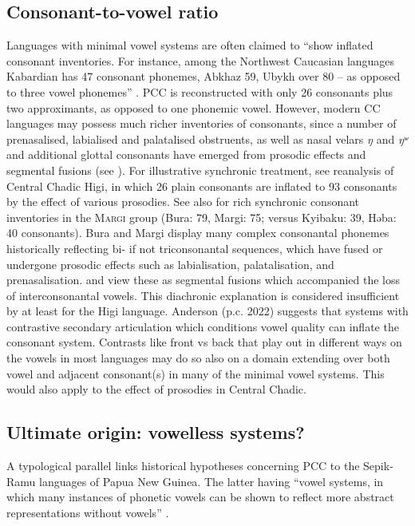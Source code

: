 \documentclass[output=paper]{langscibook}
\begin{document}
\subsection{Consonant-to-vowel ratio}
\label{sec:Wolff:3.1}
Languages with minimal vowel systems are often claimed to “show inflated consonant inventories. For instance, among the Northwest Caucasian languages Kabardian has 47 consonant phonemes, Abkhaz 59, Ubykh over 80 – as opposed to three vowel phonemes” \citep[66]{Anderson2016}. PCC is reconstructed with only 26 consonants plus two approximants, as opposed to one phonemic vowel. However, modern CC languages may possess much richer inventories of consonants, since a number of prenasalised, labialised and palatalised obstruents, as well as nasal velars \textit{ŋ} and \textit{ŋʷ} and additional glottal consonants have emerged from prosodic effects and segmental fusions (see \citealt{Wolffinpressb}). For illustrative synchronic treatment, see  reanalysis of Central Chadic Higi, in which 26 plain consonants are inflated to 93 consonants by the effect of various prosodies. See also \citet[465-468]{Hoffmann1987} for rich synchronic consonant inventories in the \textsc{Margi} group (Bura: 79, Margi: 75; versus Kyibaku: 39, Həba: 40 consonants). Bura and Margi display many complex consonantal phonemes historically reflecting bi- if not triconsonantal sequences, which have fused or undergone prosodic effects such as labialisation, palatalisation, and prenasalisation. \citet[228]{NewmanMa1966} and \citet[17]{Newman1977} view these as segmental fusions which accompanied the loss of interconsonantal vowels. This diachronic explanation is considered insufficient by \citet[271]{Barreteau1983} at least for the Higi language. Anderson (p.c. 2022) suggests that systems with contrastive secondary articulation which conditions vowel quality can inflate the consonant system. Contrasts like front vs back that play out in different ways on the vowels in most languages may do so also on a domain extending over both vowel and adjacent consonant(s) in many of the minimal vowel systems. This would also apply to the effect of prosodies in Central Chadic. 

\subsection{Ultimate origin: vowelless systems?}
\label{sec:Wolff:3.2}
A typological parallel links historical hypotheses concerning PCC to the Sepik-Ramu languages of Papua New Guinea. The latter having “vowel systems, in which many instances of phonetic vowels can be shown to reflect more abstract representations without vowels” \citep[79]{Anderson2016}.
\end{document}
